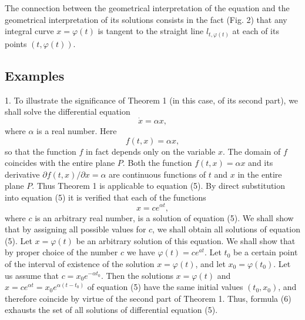 \documentclass[10pt,a5paper]{book}
\theoremstyle{plain}
\theoremstyle{definition}
\theoremstyle{remark}
\begin{document}
The connection between the geometrical interpretation of the equation and the geometrical interpretation of its solutions consists in the fact (Fig. 2) that any integral curve $x=\varphi(t)$ is tangent to the straight line $l_{t, \varphi(t)}$ at each of its points $(t, \varphi(t))$.

\subsection*{Examples}
1. To illustrate the significance of Theorem 1 (in this case, of its second part), we shall solve the differential equation
\begin{equation*}
\dot{x}=\alpha x, \tag{5}
\end{equation*}
where $\alpha$ is a real number. Here
\[
f(t, x)=\alpha x,
\]
so that the function $f$ in fact depends only on the variable $x$. The domain of $f$ coincides with the entire plane $P$. Both the function $f(t, x)=\alpha x$ and its derivative $\partial f(t, x) / \partial x=\alpha$ are continuous functions of $t$ and $x$ in the entire plane $P$. Thus Theorem 1 is applicable to equation (5). By direct substitution into equation (5) it is verified that each of the functions
\begin{equation*}
x=c e^{\alpha t}, \tag{6}
\end{equation*}
where $c$ is an arbitrary real number, is a solution of equation (5). We shall show that by assigning all possible values for $c$, we shall obtain all solutions of equation (5). Let $x=\varphi(t)$ be an arbitrary solution of this equation. We shall show that by proper choice of the number $c$ we have $\varphi(t)=c e^{a t}$. Let $t_{0}$ be a certain point of the interval of existence of the solution $x=\varphi(t)$, and let $x_{0}=\varphi\left(t_{0}\right)$. Let us assume that $c=x_{0} e^{-\alpha t_{0}}$. Then the solutions $x=\varphi(t)$ and $x=c e^{\alpha t}=x_{0} e^{\alpha\left(t-t_{0}\right)}$ of equation (5) have the same initial values $\left(t_{0}, x_{0}\right)$, and therefore coincide by virtue of the second part of Theorem 1. Thus, formula (6) exhausts the set of all solutions of differential equation (5).
\end{document}

